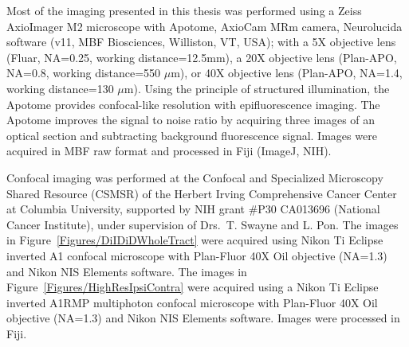 Most of the imaging presented in this thesis was performed using a Zeiss AxioImager M2 microscope with Apotome, AxioCam MRm camera, Neurolucida software (v11, MBF Biosciences, Williston, VT, USA); with a 5X objective lens (Fluar, NA=0.25, working distance=12.5mm), a 20X objective lens (Plan-APO, NA=0.8, working distance=550 $\mu$m), or 40X objective lens (Plan-APO, NA=1.4, working distance=130 $\mu$m).
Using the principle of structured illumination, the Apotome provides confocal-like resolution with epifluorescence imaging.
The Apotome improves the signal to noise ratio by acquiring three images of an optical section and subtracting background fluorescence signal.
Images were acquired in MBF raw format and processed in Fiji (ImageJ, NIH).

Confocal imaging was performed at the Confocal and Specialized Microscopy Shared Resource (CSMSR) of the Herbert Irving Comprehensive Cancer Center at Columbia University, supported by NIH grant \#P30 CA013696 (National Cancer Institute), under supervision of Drs.~T. Swayne and L. Pon.
The images in Figure~\ref{Figures/DiIDiDWholeTract} were acquired using Nikon Ti Eclipse inverted A1 confocal microscope with Plan-Fluor 40X Oil objective (NA=1.3) and Nikon NIS Elements software.
The images in Figure~\ref{Figures/HighResIpsiContra} were acquired using a Nikon Ti Eclipse inverted A1RMP multiphoton confocal microscope with Plan-Fluor 40X Oil objective (NA=1.3) and Nikon NIS Elements software.
Images were processed in Fiji.
